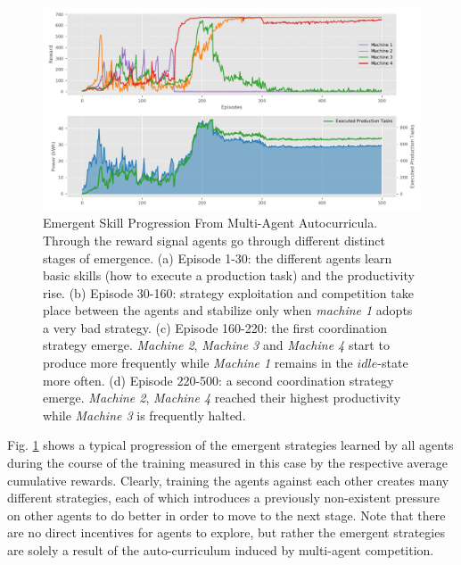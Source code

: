 %
\begin{figure}[b]
\sidecaption
\includegraphics[scale=.48]{images/experiment_1_results}
%
%
\caption{Emergent Skill Progression From Multi-Agent Autocurricula. Through the reward signal
agents go through different distinct stages of emergence. (a) Episode 1-30: the different agents learn basic skills (how to execute a production task) and the productivity rise. (b) Episode 30-160: strategy exploitation and competition take place between the agents and stabilize only when \textit{machine 1} adopts a very bad strategy. (c) Episode 160-220: the first coordination strategy emerge. \textit{Machine 2}, \textit{Machine 3} and \textit{Machine 4} start to produce more frequently while \textit{Machine 1} remains in the $idle$-state more often. (d) Episode 220-500: a second coordination strategy emerge.  \textit{Machine 2}, \textit{Machine 4} reached their highest productivity while \textit{Machine 3} is frequently halted.}
\label{fig:scenario_1_results}       %
\end{figure}

Fig. \ref{fig:scenario_1_results} shows a typical progression of the emergent strategies learned by all agents during the course of the training measured in this case by the respective average cumulative rewards. Clearly, training the agents against each other creates many different strategies, each of which introduces a previously non-existent pressure on other agents to do better in order to move to the next stage. Note that there are no direct incentives for agents to explore, but rather the emergent strategies are solely a result of the auto-curriculum induced by multi-agent competition.

